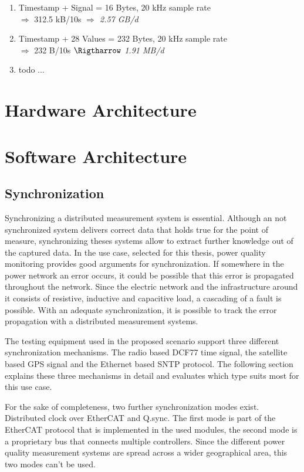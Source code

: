 \begin{enumerate}
	\item Timestamp + Signal = 16 Bytes, 20 kHz sample rate \\ $\Rightarrow$ 312.5 kB/10s \textit{$\Rightarrow$ 2.57 GB/d}
	\item Timestamp + 28 Values = 232 Bytes, 20 kHz sample rate \\ $\Rightarrow$ 232 B/10s \textit{$\Rigtharrow$ 1.91 MB/d}
	\item todo ...
\end{enumerate}

\section{Hardware Architecture}

\section{Software Architecture}

\subsection{Synchronization}
Synchronizing a distributed measurement system is essential. Although an not synchronized system delivers correct data that holds true for the point of measure, synchronizing theses systems allow to extract further knowledge out of the captured data. In the use case, selected for this thesis, power quality monitoring provides good arguments for synchronization. If somewhere in the power network an error occurs, it could be possible that this error is propagated throughout the network. Since the electric network and the infrastructure around it consists of resistive, inductive and capacitive load, a cascading of a fault is possible. With an adequate synchronization, it is possible to track the error propagation with a distributed measurement systems.

The testing equipment used in the proposed scenario support three different synchronization mechanisms. The radio based DCF77 time signal, the satellite based GPS signal and the Ethernet based SNTP protocol. The following section explains these three mechanisms in detail and evaluates which type suits most for this use case.

For the sake of completeness, two further synchronization modes exist. Distributed clock over EtherCAT and Q.sync. The first mode is part of the EtherCAT protocol that is implemented in the used modules, the second mode is a proprietary bus that connects multiple controllers. Since the different power quality measurement systems are spread across a wider geographical area, this two modes can't be used.

